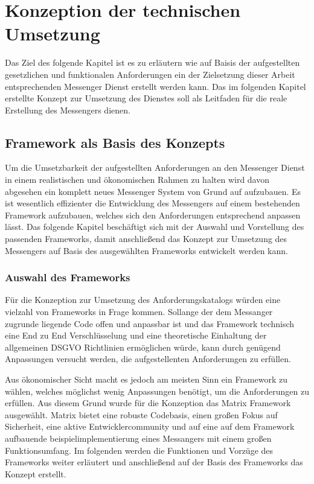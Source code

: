 \chapter{Konzeption der technischen Umsetzung}\label{chapter:tanforderungen}
Das Ziel des folgende Kapitel ist es zu erläutern wie auf Baisis der aufgestellten gesetzlichen und funktionalen Anforderungen ein der Zielsetzung dieser Arbeit entsprechenden Messenger Dienst erstellt werden kann. Das im folgenden Kapitel erstellte Konzept zur Umsetzung des Dienstes soll als Leitfaden für die reale Erstellung des Messengers dienen. 

\section{Framework als Basis des Konzepts}\label{chapter:kr}
Um die Umsetzbarkeit der aufgestellten Anforderungen an den Messenger Dienst in einem realistischen und ökonomischen Rahmen zu halten wird davon abgesehen ein komplett neues Messenger System von Grund auf aufzubauen. Es ist wesentlich effizienter die Entwicklung des Messengers auf einem bestehenden Framework aufzubauen, welches sich den Anforderungen entsprechend anpassen lässt. Das folgende Kapitel beschäftigt sich mit der Auswahl und Vorstellung des passenden Frameworks, damit anschließend das Konzept zur Umsetzung des Messengers auf Basis des ausgewählten Frameworks entwickelt werden kann. 

\subsection{Auswahl des Frameworks}\label{chapter:am}
Für die Konzeption zur Umsetzung des Anforderungskatalogs würden eine vielzahl von Frameworks in Frage kommen. Sollange der dem Messanger zugrunde liegende Code offen und anpassbar ist und das Framework technisch eine End zu End Verschlüsselung und eine theoretische Einhaltung der allgemeinen DSGVO Richtlinien ermöglichen würde, kann durch genügend Anpassungen versucht werden, die aufgestellenten Anforderungen zu erfüllen. 

Aus ökonomischer Sicht macht es jedoch am meisten Sinn ein Framework zu wählen, welches möglichst wenig Anpassungen benötigt, um die Anforderungen zu erfüllen. Aus diesem Grund wurde für die Konzeption das Matrix Framework ausgewählt.
Matrix bietet eine robuste Codebasis, einen großen Fokus auf Sicherheit, eine aktive Entwicklercommunity und auf eine auf dem Framework aufbauende beispielimplementierung eines Messangers mit einem großen Funktionsumfang. Im folgenden werden die Funktionen und Vorzüge des Frameworks weiter erläutert und anschließend auf der Basis des Frameworks das Konzept erstellt. 

